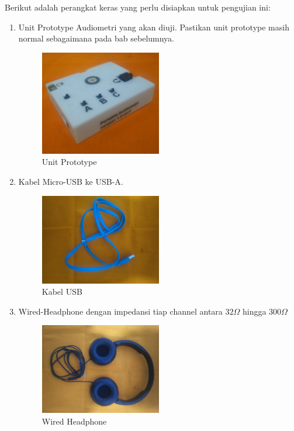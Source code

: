 \documentclass[12pt,]{article}
\begin{document}
	Berikut adalah perangkat keras yang perlu disiapkan untuk pengujian ini:
	\begin{enumerate}
		\item Unit Prototype Audiometri yang akan diuji.
		Pastikan unit prototype masih normal sebagaimana pada bab sebelumnya.
		\begin{figure}[!ht]
			\centering
			\includegraphics[width=150pt]{images/foto/unit}
			\caption{Unit Prototype}
		\end{figure}
		
		\item Kabel Micro-USB ke USB-A.
		\begin{figure}[!ht]
			\centering
			\includegraphics[width=150pt]{images/foto/kabel}
			\caption{Kabel USB}
		\end{figure}
		
		\item Wired-Headphone dengan impedansi tiap channel antara $32\Omega$ hingga $300\Omega$
		\begin{figure}[!ht]
			\centering
			\includegraphics[width=150pt]{images/foto/phone}
			\caption{Wired Headphone}
		\end{figure}
		

\end{enumerate}
\end{document}
